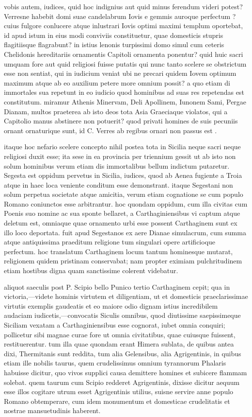  vobis autem, iudices, quid hoc indignius aut quid minus ferendum videri potest? Verresne habebit domi suae candelabrum Iovis e gemmis auroque perfectum ? cuius fulgore conlucere atque inlustrari Iovis optimi maximi templum oportebat, id apud istum in eius modi conviviis constituetur, quae domesticis stupris flagitiisque flagrabunt? in istius lenonis turpissimi domo simul cum ceteris Chelidonis hereditariis ornamentis Capitoli ornamenta ponentur? quid huic sacri umquam fore aut quid religiosi fuisse putatis qui nunc tanto scelere se obstrictum esse non sentiat, qui in iudicium veniat ubi ne precari quidem Iovem optimum maximum atque ab eo auxilium petere more omnium possit? a quo etiam di immortales sua repetunt in eo iudicio quod hominibus ad suas res repetendas est constitutum. miramur Athenis Minervam, Deli Apollinem, Iunonem Sami, Pergae Dianam, multos praeterea ab isto deos tota Asia Graeciaque violatos, qui a Capitolio manus abstinere non potuerit? quod privati homines de suis pecuniis ornant ornaturique sunt, id C. Verres ab regibus ornari non passus est .

 itaque hoc nefario scelere concepto nihil postea tota in Sicilia neque sacri neque religiosi duxit esse; ita sese in ea provincia per triennium gessit ut ab isto non solum hominibus verum etiam dis immortalibus bellum indictum putaretur. Segesta est oppidum pervetus in Sicilia, iudices, quod ab Aenea fugiente a Troia atque in haec loca veniente conditum esse demonstrant. itaque Segestani non solum perpetua societate atque amicitia, verum etiam cognatione se cum populo Romano coniunctos esse arbitrantur. hoc quondam oppidum, cum illa civitas cum Poenis suo nomine ac sua sponte bellaret, a Carthaginiensibus vi captum atque deletum est, omniaque quae ornamento urbi esse possent Carthaginem sunt ex illo loco deportata. fuit apud Segestanos ex aere Dianae simulacrum, cum summa atque antiquissima praeditum religione tum singulari opere artificioque perfectum. hoc translatum Carthaginem locum tantum hominesque mutarat, religionem quidem pristinam conservabat; nam propter eximiam pulchritudinem etiam hostibus digna quam sanctissime colerent videbatur.

 aliquot saeculis post P. Scipio bello Punico tertio Carthaginem cepit; qua in victoria,—videte hominis virtutem et diligentiam, ut et domesticis praeclarissimae virtutis exemplis gaudeatis et eo maiore odio dignam istius incredibilem audaciam iudicetis,—convocatis Siculis omnibus, quod diutissime saepissimeque Siciliam vexatam a Carthaginiensibus esse cognorat, iubet omnia conquiri; pollicetur sibi magnae curae fore ut omnia civitatibus, quae cuiusque fuissent, restituerentur. tum illa quae quondam erant Himera sublata, de quibus antea dixi, Thermitanis sunt reddita, tum alia Gelensibus, alia Agrigentinis, in quibus etiam ille nobilis taurus, quem crudelissimus omnium tyrannorum Phalaris habuisse dicitur, quo vivos supplici causa demittere homines et subicere flammam solebat. quem taurum cum Scipio redderet Agrigentinis, dixisse dicitur aequum esse illos cogitare utrum esset Agrigentinis utilius, suisne servire anne populo Romano obtemperare, cum idem monumentum et domesticae crudelitatis et nostrae mansuetudinis haberent.

